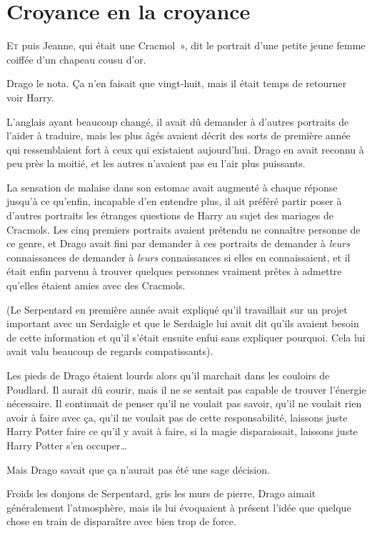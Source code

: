 \chapter{Croyance en la croyance}

\lettrine[ante=«~]{E}{t} puis Jeanne, qui était une Cracmol~», dit le portrait d'une petite jeune femme coiffée d'un chapeau cousu d'or.

Drago le nota.
Ça n'en faisait que vingt-huit, mais il était temps de retourner voir Harry.

L'anglais ayant beaucoup changé, il avait dû demander à d'autres portraits de l'aider à traduire, mais les plus âgés avaient décrit des sorts de première année qui ressemblaient fort à ceux qui existaient aujourd'hui.
Drago en avait reconnu à peu près la moitié, et les autres n'avaient pas eu l'air plus puissants.

La sensation de malaise dans son estomac avait augmenté à chaque réponse jusqu'à ce qu'enfin, incapable d'en entendre plus, il ait préféré partir poser à d'autres portraits les étranges questions de Harry au sujet des mariages de Cracmols.
Les cinq premiers portraits avaient prétendu ne connaître personne de ce genre, et Drago avait fini par demander à ces portraits de demander à \emph{leurs} connaissances de demander à \emph{leurs} connaissances si elles en connaissaient, et il était enfin parvenu à trouver quelques personnes vraiment prêtes à admettre qu'elles étaient amies avec des Cracmols.

(Le Serpentard en première année avait expliqué qu'il travaillait sur un projet important avec un Serdaigle et que le Serdaigle lui avait dit qu'ils avaient besoin de cette information et qu'il s'était ensuite enfui sans expliquer pourquoi.
Cela lui avait valu beaucoup de regards compatissants).

Les pieds de Drago étaient lourds alors qu'il marchait dans les couloirs de Poudlard.
Il aurait dû courir, mais il ne se sentait pas capable de trouver l'énergie nécessaire.
Il continuait de penser qu'il ne voulait pas savoir, qu'il ne voulait rien avoir à faire avec ça, qu'il ne voulait pas de cette responsabilité, laissons juste Harry Potter faire ce qu'il y avait à faire, si la magie disparaissait, laissons juste Harry Potter s'en occuper…

Mais Drago savait que ça n'aurait pas été une sage décision.

Froids les donjons de Serpentard, gris les murs de pierre, Drago aimait généralement l'atmosphère, mais ils lui évoquaient à présent l'idée que quelque chose en train de disparaître avec bien trop de force.

